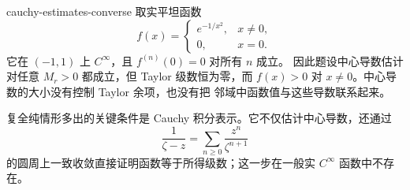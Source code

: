 \begin{solution}{cauchy-estimates-converse}
取实平坦函数
\[
 f(x)=
 \begin{cases}e^{-1/x^2},&x\ne0,\\0,&x=0.\end{cases}
\]
它在 \((-1,1)\) 上 \(C^\infty\)，且 \(f^{(n)}(0)=0\) 对所有 \(n\) 成立。
因此题设中心导数估计对任意 \(M_r>0\) 都成立，但 Taylor 级数恒为零，而
\(f(x)>0\) 对 \(x\ne0\)。中心导数的大小没有控制 Taylor 余项，也没有把
邻域中函数值与这些导数联系起来。

复全纯情形多出的关键条件是 Cauchy 积分表示。它不仅估计中心导数，还通过
\[
 \frac1{\zeta-z}
 =\sum_{n\ge0}\frac{z^n}{\zeta^{n+1}}
\]
的圆周上一致收敛直接证明函数等于所得级数；这一步在一般实
\(C^\infty\) 函数中不存在。
\end{solution}
